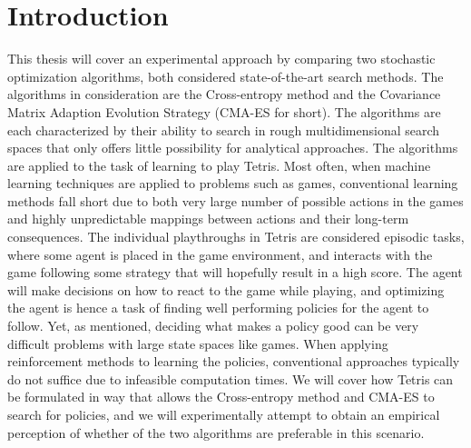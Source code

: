 \section{Introduction \label{sec:intro}}

This thesis will cover an experimental approach 
by comparing two stochastic optimization algorithms, both considered 
state-of-the-art search methods. The algorithms in consideration
are the Cross-entropy method and 
the Covariance Matrix Adaption Evolution Strategy (CMA-ES
for short). The algorithms are each characterized by their
ability to search in rough multidimensional 
search spaces that only offers little possibility 
for analytical approaches.
The algorithms are applied to the task of learning to play Tetris. 
Most often, when machine learning
techniques are applied to problems such as games, conventional
learning methods fall short due to both  very large number of 
possible actions in the games and highly unpredictable mappings 
between actions and their long-term consequences. The individual playthroughs
in Tetris are considered episodic tasks, where some agent is placed
in the game environment, and interacts with the game following some
strategy that will hopefully result in a high score. 
The agent will make decisions on how to react 
to the game while playing, and optimizing the agent is hence a task of
finding well performing policies for the agent to follow. Yet, as mentioned,
deciding what makes a policy good can be very difficult problems 
with large state spaces like games. When applying reinforcement methods to learning
the policies, conventional approaches typically do not suffice 
due to infeasible computation times. We will cover how
Tetris can be formulated in way that allows  the Cross-entropy method 
and CMA-ES to search for policies, and we will experimentally 
attempt to obtain an empirical perception of whether of the two algorithms
are preferable in this scenario.











